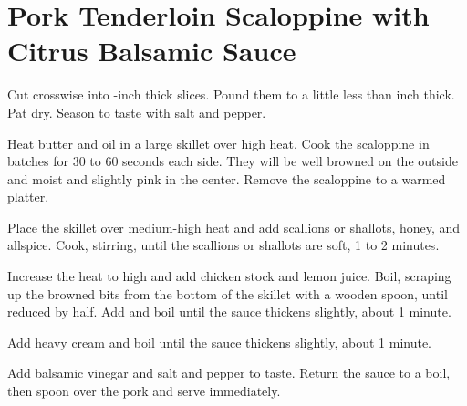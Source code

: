 \section[Pork Scaloppine with Citrus Balsamic Sauce]{Pork Tenderloin Scaloppine with Citrus Balsamic Sauce}
\begin{recipe}



	Cut crosswise into -inch thick slices. Pound them to a little less than  inch thick. Pat dry. Season to taste with salt and pepper.

	Heat butter and oil in a large skillet over high heat. Cook the scaloppine in batches for 30 to 60 seconds each side. They will be well browned on the outside and moist and slightly pink in the center. Remove the scaloppine to a warmed platter.

	Place the skillet over medium-high heat and add scallions or shallots, honey, and allspice. Cook, stirring, until the scallions or shallots are soft, 1 to 2 minutes.

	Increase the heat to high and add chicken stock and lemon juice. Boil, scraping up the browned bits from the bottom of the skillet with a wooden spoon, until reduced by half. Add and boil until the sauce thickens slightly, about 1 minute.

	Add heavy cream and boil until the sauce thickens slightly, about 1 minute.

	Add balsamic vinegar and salt and pepper to taste. Return the sauce to a boil, then spoon over the pork and serve immediately.


\end{recipe}
